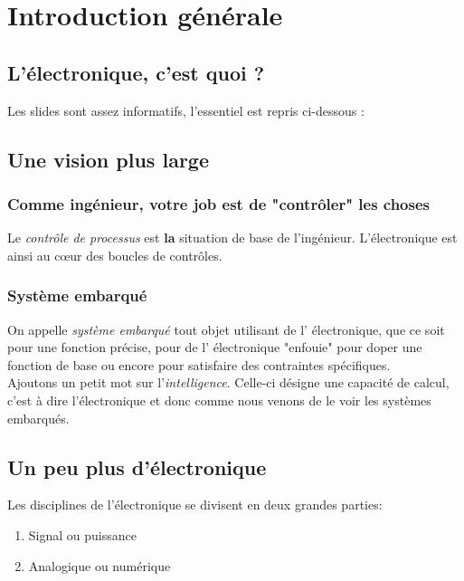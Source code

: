 \chapter{Introduction générale}
\section{L'électronique, c'est quoi ?}
Les slides sont assez informatifs, l'essentiel est repris ci-dessous :\\



\section{Une vision plus large}
\subsection{Comme ingénieur, votre job est de "contrôler" les choses}
Le \textit{contrôle de processus} est \textbf{la} situation de base
de l'ingénieur. L'électronique est ainsi au cœur des boucles de 
contrôles.

\subsection{Système embarqué}
On appelle \textit{système embarqué} tout objet utilisant de l'
électronique, que ce soit pour une fonction précise, pour de l'
électronique "enfouie" pour doper une fonction de base ou encore
pour satisfaire des contraintes spécifiques.\\

Ajoutons un petit mot sur l'\textit{intelligence}. Celle-ci désigne
une capacité de calcul, c'est à dire l'électronique et donc comme
nous venons de le voir les systèmes embarqués.


\section{Un peu plus d'électronique}
Les disciplines de l'électronique se divisent en deux grandes parties:
\begin{enumerate}
\item Signal ou puissance
\item Analogique ou numérique
\end{enumerate}

